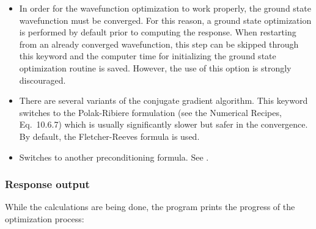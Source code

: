 \documentclass[twoside,10pt,titlepage,a4paper]{article}
\begin{document}
\begin{itemize}
\item {} In order for the wavefunction optimization to
work properly, the ground state wavefunction must be converged. For
this reason, a ground state optimization is performed by default prior
to computing the response. When restarting from an already converged
wavefunction, this step can be skipped through this keyword and the
computer time for initializing the ground state optimization routine
is saved. However, the use of this option is strongly discouraged.


\item {} There are several variants of the conjugate
gradient algorithm. This keyword switches to the Polak-Ribiere
formulation (see the Numerical Recipes, Eq.~10.6.7) which is usually
significantly slower but safer in the convergence.  By default, the
Fletcher-Reeves formula is used.


\item {} Switches to another preconditioning
formula. See .

\end{itemize}




\subsubsection{Response output}

While the calculations are being done, the program prints the progress
of the optimization process:
\end{document}
